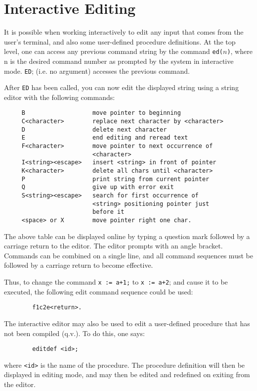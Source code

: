 \section{Interactive Editing}
It is possible when working interactively to edit any {\REDUCE} input that
comes from the user's terminal, and also some user-defined procedure
definitions.  At the top level, one can access any previous command string
by the command {\tt ed(}$n${\tt )},  where n is the desired
command number as prompted by the system in interactive mode. {\tt ED};
(i.e. no argument) accesses the previous command.

After {\tt ED} has been called, you can now edit the displayed string using a
string editor with the following commands:
\begin{verbatim}
     B                   move pointer to beginning
     C<character>        replace next character by <character>
     D                   delete next character
     E                   end editing and reread text
     F<character>        move pointer to next occurrence of
                         <character>
     I<string><escape>   insert <string> in front of pointer
     K<character>        delete all chars until <character>
     P                   print string from current pointer
     Q                   give up with error exit
     S<string><escape>   search for first occurrence of
                         <string> positioning pointer just
                         before it
     <space> or X        move pointer right one char.
\end{verbatim}
The above table can be displayed online by typing a question mark followed
by a carriage return to the editor. The editor prompts with an angle
bracket. Commands can be combined on a single line, and all command
sequences must be followed by a carriage return to become effective.

Thus, to change the command {\tt x := a+1;} to {\tt x := a+2}; and cause
it to be executed, the following edit command sequence could be used:
\begin{verbatim}
        f1c2e<return>.
\end{verbatim}
The interactive editor may also be used to edit a user-defined procedure that
has not been compiled (q.v.). To do this, one says:
\begin{verbatim}
        editdef <id>;
\end{verbatim}
where {\tt <id>} is the name of the procedure.  The procedure definition
will then be displayed in editing mode, and may then be edited and
redefined on exiting from the editor.

